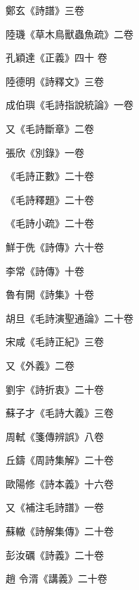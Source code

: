 \begin{pinyinscope}
 鄭玄《詩譜》三卷



 陸璣《草木鳥獸蟲魚疏》二卷



 孔穎達《正義》四十
 卷



 陸德明《詩釋文》三卷



 成伯璵《毛詩指說統論》一卷



 又《毛詩斷章》二卷



 張欣《別錄》一卷



 《毛詩正數》二十卷



 《毛詩釋題》二十卷



 《毛詩小疏》二十卷



 鮮于侁《詩傳》六十卷



 李常《詩傳》十卷



 魯有開《詩集》十卷



 胡旦《毛詩演聖通論》二十卷



 宋咸《毛詩正紀》三卷



 又《外義》二卷



 劉宇《詩折衷》二十卷



 蘇子才《毛詩大義》三卷



 周軾《箋傳辨誤》八卷



 丘鑄《周詩集解》二十卷



 歐陽修《詩本義》十六卷



 又《補注毛詩譜》一卷



 蘇轍《詩解集傳》二十卷



 彭汝礪《詩義》二十卷



 趙
 令湑《講義》二十卷




\end{pinyinscope}
